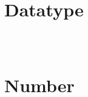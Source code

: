 \begin{lstlisting}[language=JavaScript]

\end{lstlisting}




\chapter{Datatype}







\begin{lstlisting}[language=JavaScript]

\end{lstlisting}




\begin{lstlisting}[language=JavaScript]

\end{lstlisting}





\begin{lstlisting}[language=JavaScript]

\end{lstlisting}



\chapter{Number}





\begin{lstlisting}[language=JavaScript]

\end{lstlisting}





\begin{lstlisting}[language=JavaScript]

\end{lstlisting}




\begin{lstlisting}[language=JavaScript]

\end{lstlisting}





